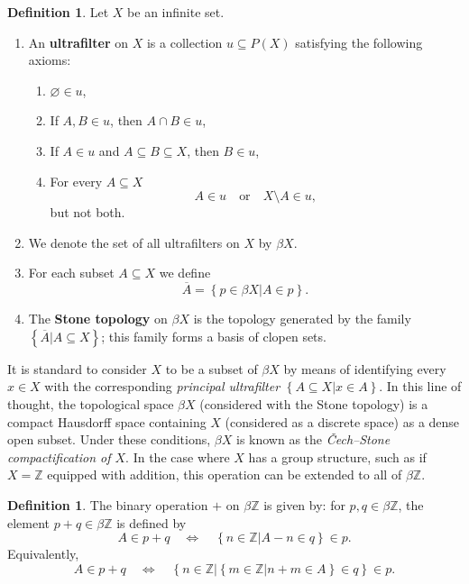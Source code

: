 \documentclass{jloganal}
\theoremstyle{definition}
\newtheorem{defn}[thm]{Definition}    %
\begin{document}
\begin{defn}
Let $X$ be an infinite set.
\begin{enumerate}
    \item An {\bf ultrafilter} on $X$ is a collection $u\subseteq P(X)$ satisfying the following axioms: 
    \begin{enumerate}
    \item 
    $\varnothing\in u$,
    \item
    If $A,B\in u$, then $A\cap B\in u$,
    \item 
    If $A\in u $ and $A\subseteq B\subseteq X$, then $B\in u$,
    \item 
    For every $A\subseteq X$
    \[
    A\in u \quad\text{or}\quad X\setminus A\in u,
    \]
    but not both.
    \end{enumerate}
    \item We denote the set of all ultrafilters on $X$ by $\beta X$.
    \item For each subset $A\subseteq X$ we define 
 \[
 \overline{A}=\left\{p\in \beta X\big| A\in p\right\}.
 \]   
 \item The {\bf Stone topology} on $\beta X$ is the topology generated by the family $\left\{\overline{A}\big| A\subseteq X\right\}$; this family forms a basis of clopen sets.
\end{enumerate}
\end{defn}

It is standard to consider $X$ to be a subset of $\beta X$ by means of identifying every $x\in X$ with the corresponding {\it principal ultrafilter} $\left\{A\subseteq X\big|x\in A\right\}$. In this line of thought, the topological space $\beta X$ (considered with the Stone topology) is a compact Hausdorff space containing $X$ (considered as a discrete space) as a dense open subset. Under these conditions, $\beta X$ is known as the {\it \v{C}ech--Stone compactification of $X$}. In the case where $X$ has a group structure, such as if $X=\mathbb Z$ equipped with addition, this operation can be extended to all of $\beta\mathbb Z$.

\begin{defn}
    The binary operation $+$ on $\beta\mathbb Z$ is given by: for $p,q\in \beta\mathbb Z$, the element $p+q\in\beta\mathbb Z$ is defined by 
 \[
 A\in p+q \quad\Leftrightarrow\quad \left\{n\in\mathbb Z\big|A-n\in q\right\}\in p.
 \]
 Equivalently,
 \[
 A\in p+q \quad\Leftrightarrow\quad \left\{n\in \mathbb Z\big|\left\{m\in \mathbb Z\big| n+m\in A\right\}\in q\right\}\in p.
 \]
\end{defn}
\end{document}
